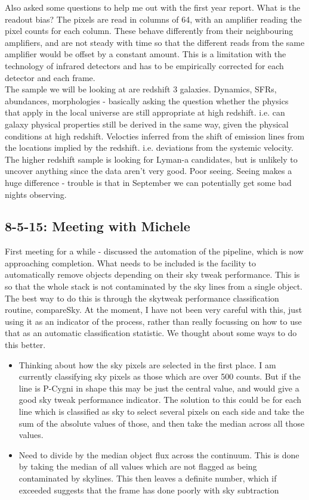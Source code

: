 \documentclass{literature}
\begin{document}
Also asked some questions to help me out with the first year report. What is the readout bias? The pixels are read in columns of 64, with an amplifier reading the pixel counts for each column. These behave differently from their neighbouring amplifiers, and are not steady with time so that the different reads from the same amplifier would be offset by a constant amount. This is a limitation with the technology of infrared detectors and has to be empirically corrected for each detector and each frame. \\ 
The sample we will be looking at are redshift 3 galaxies. Dynamics, SFRs, abundances, morphologies - basically asking the question whether the physics that apply in the local universe are still appropriate at high redshift. i.e. can galaxy physical properties still be derived in the same way, given the physical conditions at high redshift. Velocties inferred from the shift of emission lines from the locations implied by the redshift. i.e. deviations from the systemic velocity. The higher redshift sample is looking for Lyman-a candidates, but is unlikely to uncover anything since the data aren't very good. Poor seeing. Seeing makes a huge difference - trouble is that in September we can potentially get some bad nights observing.

\subsection{8-5-15: Meeting with Michele}
First meeting for a while - discussed the automation of the pipeline, which is now approaching completion. What needs to be included is the facility to automatically remove objects depending on their sky tweak performance. This is so that the whole stack is not contaminated by the sky lines from a single object. The best way to do this is through the skytweak performance classification routine, compareSky. At the moment, I have not been very careful with this, just using it as an indicator of the process, rather than really focussing on how to use that as an automatic classification statistic. We thought about some ways to do this better. 

\begin{itemize}
	\item Thinking about how the sky pixels are selected in the first place. I am currently classifying sky pixels as those which are over 500 counts. But if the line is P-Cygni in shape this may be just the central value, and would give a good sky tweak performance indicator. The solution to this could be for each line which is classified as sky to select several pixels on each side and take the sum of the absolute values of those, and then take the median across all those values. 
	\item Need to divide by the median object flux across the continuum. This is done by taking the median of all values which are not flagged as being contaminated by skylines. This then leaves a definite number, which if exceeded suggests that the frame has done poorly with sky subtraction 
\end{itemize}
\end{document}

